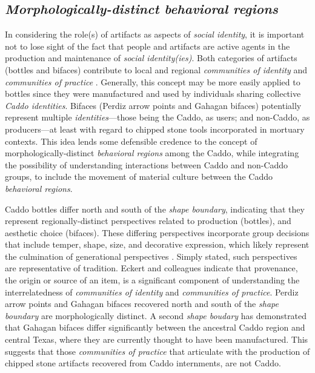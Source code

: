 \documentclass[smallextended]{svjour3}       %
\begin{document}
\hypertarget{morphologically-distinct-behavioral-regions}{%
\subsection{\texorpdfstring{\emph{Morphologically-distinct behavioral
regions}}{Morphologically-distinct behavioral regions}}\label{morphologically-distinct-behavioral-regions}}

In considering the role(s) of artifacts as aspects of \emph{social
identity}, it is important not to lose sight of the fact that people and
artifacts are active agents in the production and maintenance of
\emph{social identity(ies)}. Both categories of artifacts (bottles and
bifaces) contribute to local and regional \emph{communities of identity}
and \emph{communities of practice} \cite{RN8061}. Generally, this
concept may be more easily applied to bottles since they were
manufactured and used by individuals sharing collective \emph{Caddo
identities}. Bifaces (Perdiz arrow points and Gahagan bifaces)
potentially represent multiple \emph{identities}---those being the
Caddo, as users; and non-Caddo, as producers---at least with regard to
chipped stone tools incorporated in mortuary contexts. This idea lends
some defensible credence to the concept of morphologically-distinct
\emph{behavioral regions} among the Caddo, while integrating the
possibility of understanding interactions between Caddo and non-Caddo
groups, to include the movement of material culture between the Caddo
\emph{behavioral regions}.

Caddo bottles differ north and south of the \emph{shape boundary},
indicating that they represent regionally-distinct perspectives related
to production (bottles), and aesthetic choice (bifaces). These differing
perspectives incorporate group decisions that include temper, shape,
size, and decorative expression, which likely represent the culmination
of generational perspectives \cite{RN5610}. Simply stated, such
perspectives are representative of tradition. Eckert and colleagues
\cite{RN8061} indicate that provenance, the origin or source of an item,
is a significant component of understanding the interrelatedness of
\emph{communities of identity} and \emph{communities of practice}.
Perdiz arrow points and Gahagan bifaces recovered north and south of the
\emph{shape boundary} are morphologically distinct. A second \emph{shape
boudary} has demonstrated that Gahagan bifaces differ significantly
between the ancestral Caddo region and central Texas, where they are
currently thought to have been manufactured. This suggests that those
\emph{communities of practice} that articulate with the production of
chipped stone artifacts recovered from Caddo internments, are not Caddo.
\end{document}
